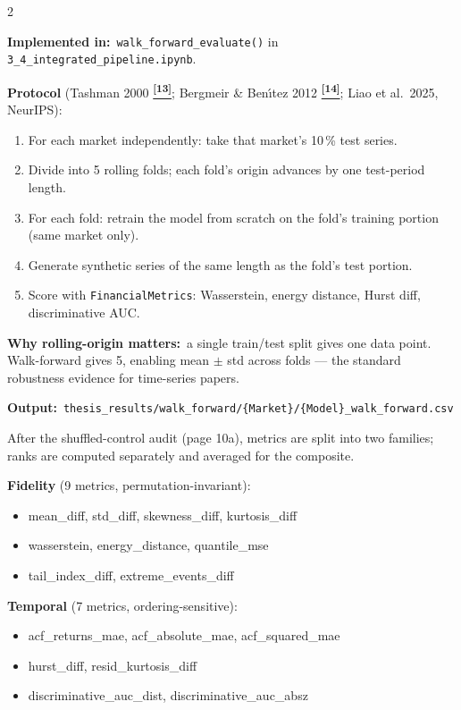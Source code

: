 \documentclass[10pt]{article}
\newcommand{\skybox}[2]{\begin{tcolorbox}[mybox={Sky}{BBg},title={#1}]#2\end{tcolorbox}}
\newcommand{\tealbox}[2]{\begin{tcolorbox}[mybox={Teal}{LBg},title={#1}]#2\end{tcolorbox}}
\newcommand{\tcite}[1]{%
  \hyperlink{R:#1}{\textsuperscript{\scriptsize\textbf{[#1]}}}}
\begin{document}
\begin{multicols}{2}
\columnbreak

\tealbox{Walk-Forward Temporal Validation (CTBench Protocol)}{%
\textbf{Implemented in:}\ \texttt{walk\_forward\_evaluate()} in \texttt{3\_4\_integrated\_pipeline.ipynb}.

\textbf{Protocol} (Tashman 2000\tcite{13}; Bergmeir \& Ben\'{\i}tez 2012\tcite{14}; Liao et al.\ 2025, NeurIPS):
\begin{enumerate}
  \item For each market independently: take that market's 10\,\% test series.
  \item Divide into 5 rolling folds; each fold's origin advances by one test-period length.
  \item For each fold: retrain the model from scratch on the fold's training portion (same market only).
  \item Generate synthetic series of the same length as the fold's test portion.
  \item Score with \texttt{FinancialMetrics}: Wasserstein, energy distance, Hurst diff, discriminative AUC.
\end{enumerate}
\textbf{Why rolling-origin matters:}\ a single train/test split gives one data point. Walk-forward gives 5, enabling mean $\pm$ std across folds --- the standard robustness evidence for time-series papers.

\textbf{Output:}\ \texttt{thesis\_results/walk\_forward/\{Market\}/\{Model\}\_walk\_forward.csv}}

\skybox{Three-Score Composite Ranking}{%
After the shuffled-control audit (page 10a), metrics are split into two families; ranks are computed separately and averaged for the composite.

\smallskip
\textbf{Fidelity} (9 metrics, permutation-invariant):
\begin{itemize}[noitemsep,topsep=1pt]
  \item mean\_diff, std\_diff, skewness\_diff, kurtosis\_diff
  \item wasserstein, energy\_distance, quantile\_mse
  \item tail\_index\_diff, extreme\_events\_diff
\end{itemize}

\smallskip
\textbf{Temporal} (7 metrics, ordering-sensitive):
\begin{itemize}[noitemsep,topsep=1pt]
  \item acf\_returns\_mae, acf\_absolute\_mae, acf\_squared\_mae
  \item hurst\_diff, resid\_kurtosis\_diff
  \item discriminative\_auc\_dist, discriminative\_auc\_absz
\end{itemize}

}
\end{multicols}
\end{document}
